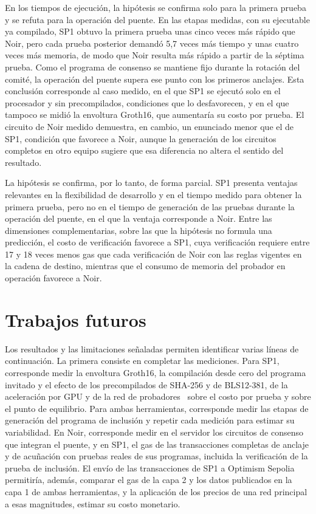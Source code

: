 En los tiempos de ejecución, la hipótesis se confirma solo para la primera prueba y se refuta para
la operación del puente. En las etapas medidas, con su ejecutable ya compilado, SP1 obtuvo la
primera prueba unas cinco veces más rápido que Noir, pero
cada prueba posterior demandó 5,7 veces más tiempo y unas cuatro veces más memoria, de modo que
Noir resulta más rápido a partir de la séptima prueba. Como el programa de consenso se mantiene
fijo durante la rotación del comité, la operación del puente supera ese punto con los primeros
anclajes. Esta conclusión corresponde al caso medido, en el que SP1 se ejecutó solo en el
procesador y sin precompilados, condiciones que lo desfavorecen, y en el que tampoco se midió la
envoltura Groth16, que aumentaría su costo por prueba. El circuito de Noir medido demuestra, en
cambio, un enunciado menor que el de SP1, condición que favorece a Noir, aunque la generación de
los circuitos completos en otro equipo sugiere que esa diferencia no altera el sentido del
resultado.

La hipótesis se confirma, por lo tanto, de forma parcial. SP1 presenta ventajas relevantes
en la flexibilidad de desarrollo y en el tiempo medido para obtener la primera prueba, pero no
en el tiempo de generación de las pruebas durante la operación del puente, en el que la ventaja
corresponde a Noir. Entre las dimensiones complementarias, sobre las que la hipótesis no formula
una predicción, el costo de verificación favorece a SP1, cuya verificación requiere entre 17 y 18
veces menos gas que cada verificación de Noir con las reglas vigentes en la cadena de destino,
mientras que el consumo de memoria del probador en operación favorece a Noir.

\section{Trabajos futuros}
\label{sec:trabajos_futuros}

Los resultados y las limitaciones señaladas permiten identificar varias líneas de continuación.
La primera consiste en completar las mediciones. Para SP1, corresponde medir la envoltura Groth16,
la compilación desde cero del programa invitado y el efecto de los precompilados de SHA-256 y de
BLS12-381, de la aceleración por GPU y de la red de probadores~\cite{succinctnetwork} sobre el
costo por prueba y sobre el punto de equilibrio. Para ambas herramientas, corresponde medir las
etapas de generación del programa de inclusión y repetir cada medición para estimar su
variabilidad. En Noir, corresponde medir en el servidor los circuitos de consenso que integran el
puente, y en SP1, el gas de las transacciones completas de anclaje y de acuñación con pruebas reales
de sus programas, incluida la verificación de la prueba de inclusión. El envío de las
transacciones de SP1 a Optimism Sepolia permitiría, además, comparar el gas de la capa 2 y los
datos publicados en la capa 1 de ambas herramientas, y la aplicación de los precios de una red
principal a esas magnitudes, estimar su costo monetario.

